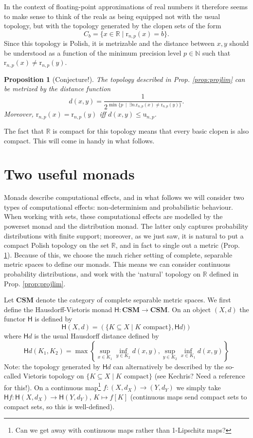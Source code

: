 \documentclass[10pt,a4paper]{article}
\theoremstyle{plain}
\newtheorem{proposition}[theorem]{Proposition}
\theoremstyle{definition}
\newcommand{\CSM}{\mathbf{CSM}}
\newcommand{\N}{\mathbb{N}}
\newcommand{\R}{\mathbb{R}}
\newcommand{\Round}[1][n,p]{\mathrm{r}_{#1}}
\newcommand{\Haus}{\mathsf{H}}
\newcommand{\uro}[1][n,p]{\mathrm{u}_{#1}}
\begin{document}
In the context of floating-point approximations of real numbers it therefore seems to make sense to think of the reals as being equipped not with the usual topology, but with the topology generated by the clopen sets of the form
\[
C_b=\{x\in\R\mid \Round(x)=b\}.
\]
Since this topology is Polish, it is metrizable and the distance between $x,y$ should be understood as a function of the minimum precision level $p\in\N$ such that $\Round(x)\neq\Round(y)$. 
\begin{proposition}[Conjecture!]\label{prop:metric}
The topology described in Prop. \ref{prop:projlim} can be metrized by the distance function
\[
d(x,y)=\frac{1}{2^{\min\{p~\mid~ \exists n.\Round(x)\neq\Round(y)\}}}.
\]
Moreover, $\Round(x)=\Round(y)$ iff $d(x,y)\leq \uro$.
\end{proposition}

The fact that $\R$ is compact for this topology means that every basic clopen is also compact. This will come in handy in what follows.

\section{Two useful monads}



Monads describe computational effects, and in what follows we will consider two types of computational effects: non-determinism and probabilistic behaviour. When working with sets, these computational effects are modelled by the powerset monad and the distribution monad. The latter only captures probability distributions with finite support; moreover, as we just saw, it is natural to put a compact Polish topology on the set $\R$, and in fact to single out a metric (Prop. \ref{prop:metric}). Because of this, we choose the much richer setting of complete, separable metric spaces to define our monads. This means we can consider continuous probability distributions, and work with the `natural' topology on $\R$ defined in Prop. \ref{prop:projlim}.

Let $\CSM$ denote the category of complete separable metric spaces. We first define the Hausdorff-Vietoris monad $\Haus: \CSM\to\CSM$. On an object $(X,d)$ the functor $\Haus$ is defined by
\[
\Haus(X,d)=\left(\{K\subseteq X\mid K\text{ compact}\}, \Haus d)\right)
\]
where $\Haus d$ is the usual Hausdorff distance defined by
\[
\Haus d(K_1,K_2)=\max\left\{\sup_{x\in K_1}\inf_{y\in K_2} d(x,y), \sup_{y\in K_2}\inf_{x\in K_1} d(x,y)\right\}
\]
Note: the topology generated by $\Haus d$ can alternatively be described by the so-called Vietoris topology on $\{K\subseteq X\mid K\text{ compact}\}$ (see Kechris? Need a reference for this!).
On a continuous map\footnote{Can we get away with continuous maps rather than 1-Lipschitz maps?} $f: (X,d_X)\to (Y,d_Y)$ we simply take $\Haus f: \Haus (X,d_X)\to \Haus(Y,d_Y)$, $K\mapsto f[K]$ (continuous maps send compact sets to compact sets, so this is well-defined). 
\end{document}
